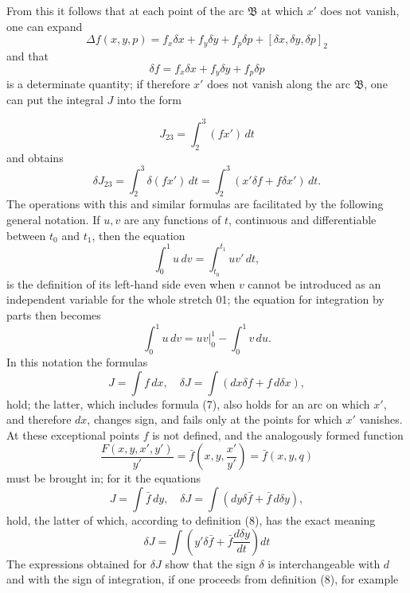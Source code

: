 \documentclass[11pt,a4paper,leqno]{article}
\begin{document}
From this it follows that at each point of the arc \(\mathfrak B\) at which \(x'\) does not vanish, one can expand
\[
\Delta f(x,y,p)=f_x\delta x+f_y\delta y+f_p\delta p+[\delta x,\delta y,\delta p]_2
\]
and that
\[
\delta f=f_x\delta x+f_y\delta y+f_p\delta p
\]
is a determinate quantity; if therefore \(x'\) does not vanish along the arc \(\mathfrak B\), one can put the integral \(J\) into the form

\[
J_{23}=\int_2^3(fx')\,dt
\]
and obtains
\[
\tag{7}
\delta J_{23}=\int_2^3\delta(fx')\,dt=\int_2^3(x'\delta f+f\delta x')\,dt.
\]
The operations with this and similar formulas are facilitated by the following general notation. If \(u,v\) are any functions of \(t\), continuous and differentiable between \(t_0\) and \(t_1\), then the equation
\[
\tag{8}
\int_0^1u\,dv=\int_{t_0}^{t_1}uv'\,dt,
\]
is the definition of its left-hand side even when \(v\) cannot be introduced as an independent variable for the whole stretch 01; the equation for integration by parts then becomes
\[
\int_0^1u\,dv=uv\bigg|_0^1-\int_0^1v\,du.
\]
In this notation the formulas
\[
J=\int f\,dx,\quad \delta J=\int(dx\delta f+f\,d\delta x),
\]
hold; the latter, which includes formula (7), also holds for an arc on which \(x'\), and therefore \(dx\), changes sign, and fails only at the points for which \(x'\) vanishes. At these exceptional points \(f\) is not defined, and the analogously formed function
\[
\frac{F(x,y,x',y')}{y'}=\bar f\left(x,y,\frac{x'}{y'}\right)=\bar f(x,y,q)
\]
must be brought in; for it the equations
\[
J=\int \bar f\,dy,\quad \delta J=\int(dy\delta\bar f+\bar f\,d\delta y),
\]
hold, the latter of which, according to definition (8), has the exact meaning
\[
\delta J=\int\left(y'\delta\bar f+\bar f\frac{d\delta y}{dt}\right)dt
\]
The expressions obtained for \(\delta J\) show that the sign \(\delta\) is interchangeable with \(d\) and with the sign of integration, if one proceeds from definition (8), for example
\end{document}
